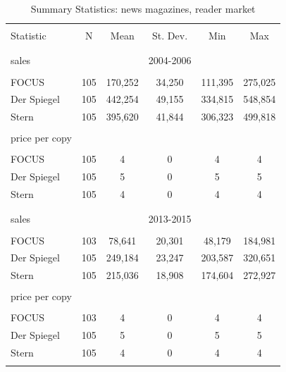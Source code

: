 \documentclass[12pt,a4paper,notitlepage]{article}
\begin{document}
\begin{table}[!htbp] \centering 
  \caption{Summary Statistics: news magazines, reader market} 
	\label{tab_news1}
\begin{tabular}{@{\extracolsep{5pt}}lccccc} 
\\[-1.8ex]\hline 
\hline \\[-1.8ex] 
Statistic & \multicolumn{1}{c}{N} & \multicolumn{1}{c}{Mean} & \multicolumn{1}{c}{St. Dev.} & \multicolumn{1}{c}{Min} & \multicolumn{1}{c}{Max} \\ 
\\[-1.8ex]\hline 
\hline \\[-1.8ex] 
sales &&& 2004-2006 \\
\hline \\[-1.8ex]  
FOCUS & 105 & 170,252 & 34,250 & 111,395 & 275,025 \\ 
Der Spiegel & 105 & 442,254 & 49,155 & 334,815 & 548,854 \\ 
Stern & 105 & 395,620 & 41,844 & 306,323 & 499,818 \\  
\hline \\[-1.8ex] 
price per copy \\
\hline \\[-1.8ex] 
FOCUS & 105 & 4 & 0 & 4 & 4 \\ 
Der Spiegel & 105 & 5 & 0 & 5 & 5 \\ 
Stern & 105 & 4 & 0 & 4 & 4 \\
\\[-1.8ex]\hline 
\hline \\[-1.8ex] 
sales &&& 2013-2015 \\
\hline \\[-1.8ex] 
FOCUS & 103 & 78,641 & 20,301 & 48,179 & 184,981 \\ 
Der Spiegel & 105 & 249,184 & 23,247 & 203,587 & 320,651 \\ 
Stern & 105 & 215,036 & 18,908 & 174,604 & 272,927 \\ 
\hline \\[-1.8ex] 
price per copy \\
\hline \\[-1.8ex] 
FOCUS & 103 & 4 & 0 & 4 & 4 \\ 
Der Spiegel & 105 & 5 & 0 & 5 & 5 \\ 
Stern & 105 & 4 & 0 & 4 & 4 \\ 
\hline \\[-1.8ex] 
\end{tabular} 
\end{table} 
\end{document}
